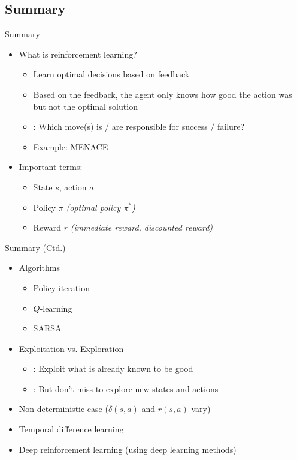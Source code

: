\subsection{Summary}

\begin{frame}{Summary}{}
	\begin{itemize}
		\item What is reinforcement learning?
		\begin{itemize}
			\item Learn optimal decisions based on feedback
			\item Based on the feedback, the agent only knows how good the action was but not the optimal solution
			\item {}: Which move(s) is / are responsible for success / failure?
			\item Example: MENACE
		\end{itemize}
		\item Important terms:
		\begin{itemize}
			\item State $s$, action $a$
			\item Policy $\pi$ \textit{(optimal policy $\pi^*$)}
			\item Reward $r$ \textit{(immediate reward, discounted reward)}
		\end{itemize}
	\end{itemize}
\end{frame}


\begin{frame}{Summary (Ctd.)}{}
	\begin{itemize}
		\item Algorithms
		\begin{itemize}
			\item Policy iteration
			\item $Q$-learning
			\item SARSA
		\end{itemize}
		\item Exploitation vs. Exploration
		\begin{itemize}
			\item {}: Exploit what is already known to be good
			\item {}: But don't miss to explore new states and actions
		\end{itemize}
		\item Non-deterministic case ($\delta(s, a)$ and $r(s, a)$ vary)
		\item Temporal difference learning
		\item Deep reinforcement learning (using deep learning methods)
	\end{itemize}
\end{frame}


